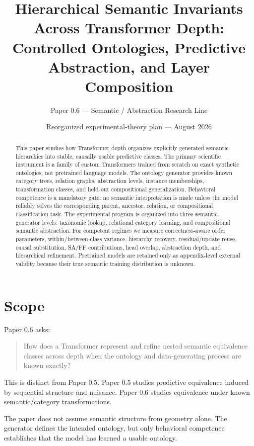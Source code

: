 \documentclass[10pt]{article}
\title{Hierarchical Semantic Invariants Across Transformer Depth:\\
Controlled Ontologies, Predictive Abstraction, and Layer Composition}
\author{Paper 0.6 --- Semantic / Abstraction Research Line}
\date{Reorganized experimental-theory plan --- August 2026}
\begin{document}
\maketitle

\begin{abstract}
This paper studies how Transformer depth organizes explicitly generated semantic hierarchies into stable, causally usable predictive classes. The primary scientific instrument is a family of custom Transformers trained from scratch on exact synthetic ontologies, not pretrained language models. The ontology generator provides known category trees, relation graphs, abstraction levels, instance memberships, transformation classes, and held-out compositional generalization. Behavioral competence is a mandatory gate: no semantic interpretation is made unless the model reliably solves the corresponding parent, ancestor, relation, or compositional classification task. The experimental program is organized into three semantic-generator levels: taxonomic lookup, relational category learning, and compositional semantic abstraction. For competent regimes we measure correctness-aware order parameters, within/between-class variance, hierarchy recovery, residual/update reuse, causal substitution, SA/FF contributions, head overlap, abstraction depth, and hierarchical refinement. Pretrained models are retained only as appendix-level external validity because their true semantic training distribution is unknown.
\end{abstract}

\section{Scope}

Paper 0.6 asks:

\begin{quote}
How does a Transformer represent and refine nested semantic equivalence classes across depth when the ontology and data-generating process are known exactly?
\end{quote}

This is distinct from Paper 0.5. Paper 0.5 studies predictive equivalence induced by sequential structure and nuisance. Paper 0.6 studies equivalence under known semantic/category transformations.

The paper does not assume semantic structure from geometry alone. The generator defines the intended ontology, but only behavioral competence establishes that the model has learned a usable ontology.
\end{document}
